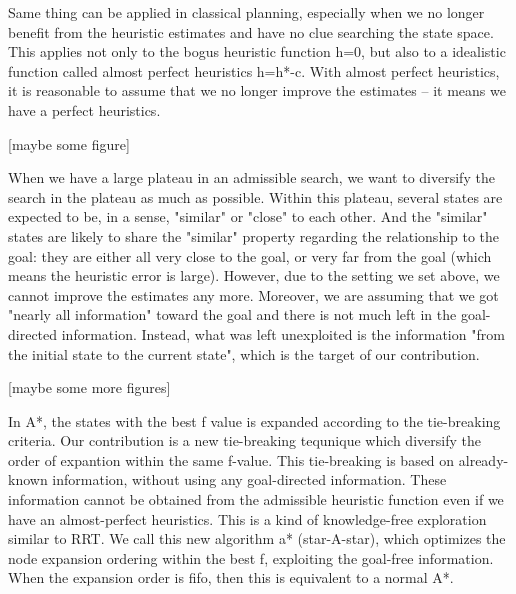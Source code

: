 

Same thing can be applied in classical planning, especially when we no
longer benefit from the heuristic estimates and have no clue searching the
state space.
This applies not only to the bogus heuristic function h=0, but also to a idealistic
function called almost perfect heuristics h=h*-c. With almost perfect
heuristics, it is reasonable to assume that we no longer improve the
estimates -- it means we have a perfect heuristics.

[maybe some figure]

When we have a large plateau in an admissible search,
we want to diversify the search in the plateau as much as possible.
Within this plateau, several states are expected to be, in a sense,
"similar" or "close" to each other. And the "similar" states are likely to
share the "similar" property regarding the relationship to the goal:
they are either all very close to the goal, or very far from the goal (which means
the heuristic error is large). However, due to the setting we set
above, we cannot improve the estimates any more. Moreover, we are assuming
that we got "nearly all information" toward the goal and there is not much
left in the goal-directed information.
Instead, what was left unexploited is the information "from the initial state to the
current state", which is the target of our contribution.

[maybe some more figures]


In A*, the states with the best f value is expanded according to the
tie-breaking criteria. Our contribution is a new tie-breaking tequnique
which diversify the order of expantion within the same f-value.
This tie-breaking is based on already-known information,
without using any goal-directed information.
These information cannot be obtained from the admissible heuristic function even if we
have an almost-perfect heuristics.
This is a kind of knowledge-free exploration similar to RRT.
We call this new algorithm \*a* (star-A-star), which optimizes the node
expansion ordering within the best f, exploiting the goal-free information.
When the expansion order is fifo, then this is equivalent to a normal A*.
